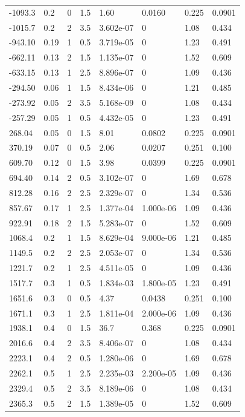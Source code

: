 \documentclass[preview]{standalone}
\begin{document}
{{\begin{tabular}{L{1.2cm}C{1.2cm} C{0.3cm}C{0.5cm} C{1.4cm}C{1.4cm} C{1.4cm}C{1.4cm}}
  -1093.3  &   0.2  & 0     & 1.5 &  1.60  & 0.0160  & 0.225 &  0.0901   \\ 
  -1015.7  &   0.2  & 2     & 3.5 &  3.602e-07  & 0  & 1.08 &  0.434   \\ 
  -943.10  &  0.19  & 1     & 0.5 &  3.719e-05  & 0  & 1.23 &  0.491   \\ 
  -662.11  &  0.13  & 2     & 1.5 &  1.135e-07  & 0  & 1.52 &  0.609   \\ 
  -633.15  &  0.13  & 1     & 2.5 &  8.896e-07  & 0  & 1.09 &  0.436   \\ 
  -294.50  &  0.06  & 1     & 1.5 &  8.434e-06  & 0  & 1.21 &  0.485   \\ 
  -273.92  &  0.05  & 2     & 3.5 &  5.168e-09  & 0  & 1.08 &  0.434   \\ 
  -257.29  &  0.05  & 1     & 0.5 &  4.432e-05  & 0  & 1.23 &  0.491   \\ 
  268.04  &  0.05  & 0     & 1.5 &  8.01  & 0.0802  & 0.225 &  0.0901   \\ 
  370.19  &  0.07  & 0     & 0.5 &  2.06  & 0.0207  & 0.251 &  0.100   \\ 
  609.70  &  0.12  & 0     & 1.5 &  3.98  & 0.0399  & 0.225 &  0.0901   \\ 
  694.40  &  0.14  & 2     & 0.5 &  3.102e-07  & 0  & 1.69 &  0.678   \\ 
  812.28  &  0.16  & 2     & 2.5 &  2.329e-07  & 0  & 1.34 &  0.536   \\ 
  857.67  &  0.17  & 1     & 2.5 &  1.377e-04  & 1.000e-06  & 1.09 &  0.436   \\ 
  922.91  &  0.18  & 2     & 1.5 &  5.283e-07  & 0  & 1.52 &  0.609   \\ 
  1068.4  &   0.2  & 1     & 1.5 &  8.629e-04  & 9.000e-06  & 1.21 &  0.485   \\ 
  1149.5  &   0.2  & 2     & 2.5 &  2.053e-07  & 0  & 1.34 &  0.536   \\ 
  1221.7  &   0.2  & 1     & 2.5 &  4.511e-05  & 0  & 1.09 &  0.436   \\ 
  1517.7  &   0.3  & 1     & 0.5 &  1.834e-03  & 1.800e-05  & 1.23 &  0.491   \\ 
  1651.6  &   0.3  & 0     & 0.5 &  4.37  & 0.0438  & 0.251 &  0.100   \\ 
  1671.1  &   0.3  & 1     & 2.5 &  1.811e-04  & 2.000e-06  & 1.09 &  0.436   \\ 
  1938.1  &   0.4  & 0     & 1.5 &  36.7  & 0.368  & 0.225 &  0.0901   \\ 
  2016.6  &   0.4  & 2     & 3.5 &  8.406e-07  & 0  & 1.08 &  0.434   \\ 
  2223.1  &   0.4  & 2     & 0.5 &  1.280e-06  & 0  & 1.69 &  0.678   \\ 
  2262.1  &   0.5  & 1     & 2.5 &  2.235e-03  & 2.200e-05  & 1.09 &  0.436   \\ 
  2329.4  &   0.5  & 2     & 3.5 &  8.189e-06  & 0  & 1.08 &  0.434   \\ 
  2365.3  &   0.5  & 2     & 1.5 &  1.389e-05  & 0  & 1.52 &  0.609   \\ 
\hline 
\end{tabular} 

}}
\end{document}
